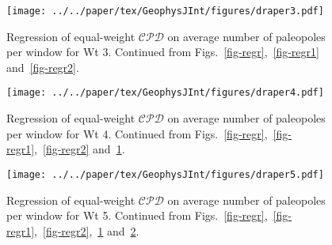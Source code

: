 \begin{figure}
  \centering
  \texttt{[image: ../../paper/tex/GeophysJInt/figures/draper3.pdf]}
  \caption[Regression of $\mathcal{CPD}$ on average number of paleopoles per
    window for Wt 3]{Regression of equal-weight $\mathcal{CPD}$ on average
    number of paleopoles per window for Wt 3.  Continued from
    Figs.~\ref{fig-regr},~\ref{fig-regr1} and~\ref{fig-regr2}.}\label{fig-regr3}
\end{figure}

\begin{figure}
  \centering
  \texttt{[image: ../../paper/tex/GeophysJInt/figures/draper4.pdf]}
  \caption[Regression of $\mathcal{CPD}$ on average number of paleopoles per
    window for Wt 4]{Regression of equal-weight $\mathcal{CPD}$ on average
    number of paleopoles per window for Wt 4.  Continued from
    Figs.~\ref{fig-regr},~\ref{fig-regr1},~\ref{fig-regr2}
    and~\ref{fig-regr3}.}\label{fig-regr4}
\end{figure}

\begin{figure}
  \centering
  \texttt{[image: ../../paper/tex/GeophysJInt/figures/draper5.pdf]}
  \caption[Regression of $\mathcal{CPD}$ on average number of paleopoles per
    window for Wt 5]{Regression of equal-weight $\mathcal{CPD}$ on average
    number of paleopoles per window for Wt 5.  Continued from
    Figs.~\ref{fig-regr},~\ref{fig-regr1},~\ref{fig-regr2},~\ref{fig-regr3}
    and~\ref{fig-regr4}.}\label{fig-regr5}
\end{figure}
